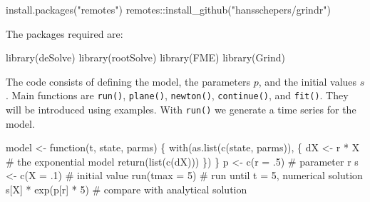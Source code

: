 \documentclass[
  a4paper,
  DIV=11,
  numbers=noendperiod,
  oneside]{scrreprt}
\newenvironment{Shaded}{}{}
\newcommand{\AttributeTok}[1]{\textcolor[rgb]{0.84,0.23,0.29}{#1}}
\newcommand{\CommentTok}[1]{\textcolor[rgb]{0.42,0.45,0.49}{#1}}
\newcommand{\ControlFlowTok}[1]{\textcolor[rgb]{0.84,0.23,0.29}{#1}}
\newcommand{\DecValTok}[1]{\textcolor[rgb]{0.00,0.36,0.77}{#1}}
\newcommand{\FunctionTok}[1]{\textcolor[rgb]{0.44,0.26,0.76}{#1}}
\newcommand{\NormalTok}[1]{\textcolor[rgb]{0.14,0.16,0.18}{#1}}
\newcommand{\OtherTok}[1]{\textcolor[rgb]{0.44,0.26,0.76}{#1}}
\newcommand{\SpecialCharTok}[1]{\textcolor[rgb]{0.00,0.36,0.77}{#1}}
\newcommand{\StringTok}[1]{\textcolor[rgb]{0.01,0.18,0.38}{#1}}
\begin{document}
\begin{Shaded}
\begin{Highlighting}[]
\FunctionTok{install.packages}\NormalTok{(}\StringTok{"remotes"}\NormalTok{)}
\NormalTok{remotes}\SpecialCharTok{::}\FunctionTok{install\_github}\NormalTok{(}\StringTok{"hansschepers/grindr"}\NormalTok{)}
\end{Highlighting}
\end{Shaded}

The packages required are:

\begin{Shaded}
\begin{Highlighting}[]
\FunctionTok{library}\NormalTok{(deSolve)}
\FunctionTok{library}\NormalTok{(rootSolve)}
\FunctionTok{library}\NormalTok{(FME)}
\FunctionTok{library}\NormalTok{(Grind)}
\end{Highlighting}
\end{Shaded}

The code consists of defining the model, the parameters \(p\), and the
initial values \(s\). Main functions are \texttt{run()},
\texttt{plane()}, \texttt{newton()}, \texttt{continue()}, and
\texttt{fit()}. They will be introduced using examples. With
\texttt{run()} we generate a time series for the model.

\begin{Shaded}
\begin{Highlighting}[]
\NormalTok{model }\OtherTok{\textless{}{-}} \ControlFlowTok{function}\NormalTok{(t, state, parms) \{}
  \FunctionTok{with}\NormalTok{(}\FunctionTok{as.list}\NormalTok{(}\FunctionTok{c}\NormalTok{(state, parms)), \{}
\NormalTok{    dX }\OtherTok{\textless{}{-}}\NormalTok{ r }\SpecialCharTok{*}\NormalTok{ X }\CommentTok{\# the exponential model}
    \FunctionTok{return}\NormalTok{(}\FunctionTok{list}\NormalTok{(}\FunctionTok{c}\NormalTok{(dX)))}
\NormalTok{  \})}
\NormalTok{\}}
\NormalTok{p }\OtherTok{\textless{}{-}} \FunctionTok{c}\NormalTok{(}\AttributeTok{r =}\NormalTok{ .}\DecValTok{5}\NormalTok{) }\CommentTok{\# parameter r}
\NormalTok{s }\OtherTok{\textless{}{-}} \FunctionTok{c}\NormalTok{(}\AttributeTok{X =}\NormalTok{ .}\DecValTok{1}\NormalTok{) }\CommentTok{\# initial value}
\FunctionTok{run}\NormalTok{(}\AttributeTok{tmax =} \DecValTok{5}\NormalTok{) }\CommentTok{\# run until t = 5, numerical solution}
\NormalTok{s[}\StringTok{\textquotesingle{}X\textquotesingle{}}\NormalTok{] }\SpecialCharTok{*} \FunctionTok{exp}\NormalTok{(p[}\StringTok{\textquotesingle{}r\textquotesingle{}}\NormalTok{] }\SpecialCharTok{*} \DecValTok{5}\NormalTok{) }\CommentTok{\# compare with analytical solution}
\end{Highlighting}
\end{Shaded}
\end{document}

